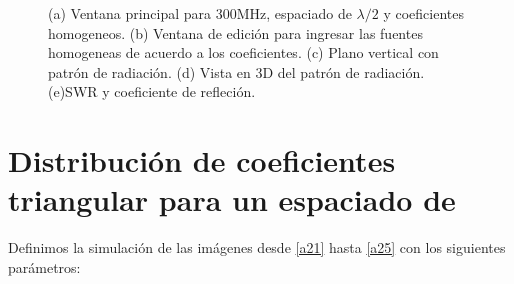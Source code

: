 \documentclass[11pt]{book}
\begin{document}
\begin{figure}[h]
	\caption{(a) Ventana principal para 300MHz, espaciado de $\lambda / 2$ y coeficientes homogeneos. (b) Ventana de edición para ingresar las fuentes homogeneas de acuerdo a los coeficientes. (c) Plano vertical con patrón de radiación. (d) Vista en 3D del patrón de radiación. (e)SWR y coeficiente de refleción.}
\end{figure}

\newpage
\section{Distribución de coeficientes triangular para un espaciado de }

Definimos la simulación de las imágenes desde \eqref{a21} hasta \eqref{a25} con los siguientes parámetros:
\end{document}
